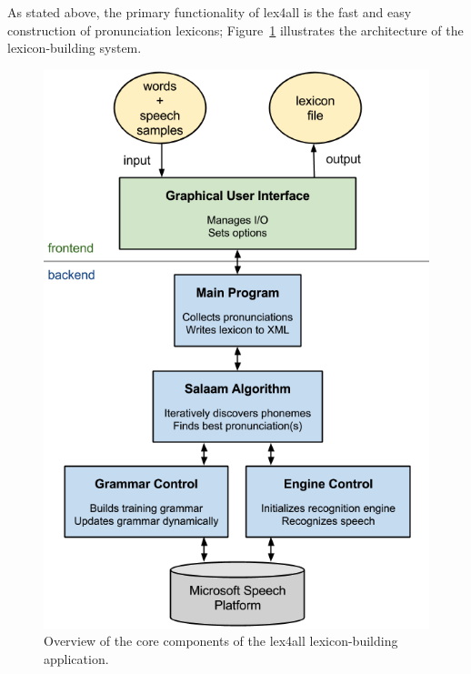 \documentclass[11pt]{article}
\begin{document}
As stated above, the primary functionality of lex4all is the fast and easy construction of pronunciation lexicons; Figure~\ref{fig:system} illustrates the architecture of the lexicon-building system.

\begin{figure}[t]
\begin{center}
\includegraphics[width=\columnwidth]{../img/SystemOverview-compact.png}
\caption{Overview of the core components of the lex4all lexicon-building application.\label{fig:system}}
\end{center}
\end{figure}
\end{document}
